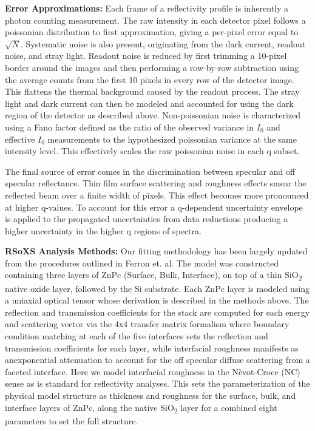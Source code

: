 \textbf{Error Approximations:} Each frame of a reflectivity profile is inherently a photon counting measurement. The raw intensity in each detector pixel follows a poissonian distribution to first approximation, giving a per-pixel error equal to \(\sqrt{N}\). Systematic noise is also present, originating from the dark current, readout noise, and stray light. Readout noise is reduced by first trimming a 10-pixel border around the images and then performing a row-by-row subtraction using the average counts from the first 10 pixels in every row of the detector image. This flattens the thermal background caused by the readout process. The stray light and dark current can then be modeled and accounted for using the dark region of the detector as described above. Non-poissonian noise is characterized using a Fano factor defined as the ratio of the observed variance in \(I_{0}\) and effective \(I_{0}\) measurements to the hypothesized poissonian variance at the same intensity level. This effectively scales the raw poissonian noise in each q subset.

The final source of error comes in the discrimination between specular and off specular reflectance. Thin film surface scattering and roughness effects smear the reflected beam over a finite width of pixels. This effect becomes more pronounced at higher q-values. To account for this error a q-dependent uncertainty envelope is applied to the propagated uncertainties from data reductions producing a higher uncertainty in the higher q regions of spectra.

\textbf{RSoXS Analysis Methods:} Our fitting methodology has been largely updated from the procedures outlined in Ferron et. al.\autocite{ferronCompositionDictatesMolecular2023} The model was constructed containing three layers of ZnPc (Surface, Bulk, Interface), on top of a thin SiO\textsubscript{2} native oxide layer, followed by the Si substrate. Each ZnPc layer is modeled using a uniaxial optical tensor whose derivation is described in the methods above. The reflection and transmission coefficients for the stack are computed for each energy and scattering vector via the 4x4 transfer matrix formalism where boundary condition matching at each of the five interfaces sets the reflection and transmission coefficients for each layer, while interfacial roughness manifests as anexponential attenuation to account for the off specular diffuse scattering from a faceted interface. Here we model interfacial roughness in the Nèvot-Croce (NC) sense as is standard for reflectivity analyses.\autocite{nevotCaracterisationSurfacesPar1980,esashiInfluenceSurfaceInterface2021} This sets the parameterization of the physical model structure as thickness and roughness for the surface, bulk, and interface layers of ZnPc, along the native SiO\textsubscript{2} layer for a combined eight parameters to set the full structure.

